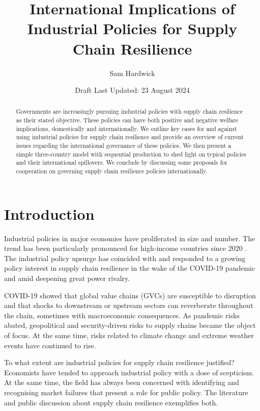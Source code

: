 \documentclass{article}
\title{International Implications of Industrial Policies for Supply Chain Resilience}
\author{Sam Hardwick}
\date{Draft Last Updated: 23 August 2024}
\begin{document}
\begin{titlingpage}
    \maketitle
    \begin{abstract}
        Governments are increasingly pursuing industrial policies with supply chain resilience as their stated objective. These policies can have both positive and negative welfare implications, domestically and internationally. We outline key cases for and against using industrial policies for supply chain resilience and provide an overview of current issues regarding the international governance of these policies. We then present a simple three-country model with sequential production to shed light on typical policies and their international spillovers. We conclude by discussing some proposals for cooperation on governing supply chain resilience policies internationally.
    \end{abstract}
\end{titlingpage}

\section{Introduction}

Industrial policies in major economies have proliferated in size and number. The trend has been particularly pronounced for high-income countries since 2020 \parencite{ilyina_industrial_2024}. The industrial policy upsurge has coincided with and responded to a growing policy interest in supply chain resilience in the wake of the COVID-19 pandemic and amid deepening great power rivalry.

COVID-19 showed that global value chains (GVCs) are susceptible to disruption and that shocks to downstream or upstream sectors can reverberate throughout the chain, sometimes with macroeconomic consequences. As pandemic risks abated, geopolitical and security-driven risks to supply chains became the object of focus. At the same time, risks related to climate change and extreme weather events have continued to rise.

To what extent are industrial policies for supply chain resilience justified? Economists have tended to approach industrial policy with a dose of scepticism. At the same time, the field has always been concerned with identifying and recognising market failures that present a role for public policy. The literature and public discussion about supply chain resilience exemplifies both.
\end{document}
